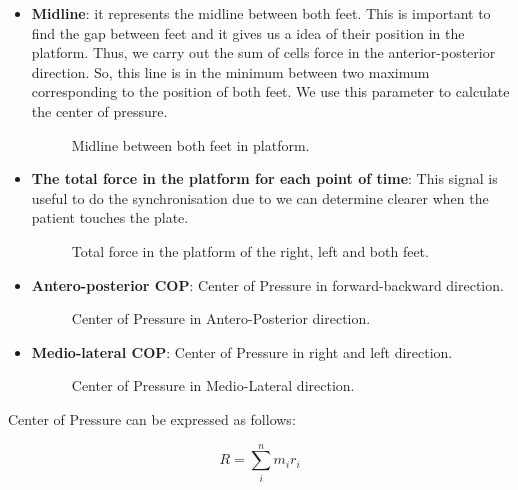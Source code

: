 \begin{itemize}
	\item \textbf{Midline}: it represents the midline between both feet. This is important to find the gap between feet and it gives us a idea of their position in the platform. Thus, we carry out the sum of cells force in the anterior-posterior direction. So, this line is in the minimum between two maximum corresponding to the position of both feet. We use this parameter to calculate the center of pressure.
	\begin{figure}[H]
		\centering
		\caption{Midline between both feet in platform.}
		\label{fig:midlineForceplate}
	\end{figure}
	
	\item \textbf{The total force in the platform for each point of time}: This signal is useful to do the synchronisation due to we can determine clearer when the patient touches the plate.
		\begin{figure}[H]
			\centering
			\caption{Total force in the platform of the right, left and both feet.}
			\label{fig:forceFP}
		\end{figure}
\newpage	
	\item \textbf{Antero-posterior COP}: Center of Pressure in forward-backward direction.
		\begin{figure}[H]
			\centering
			\caption{Center of Pressure in Antero-Posterior direction.}
			\label{fig:APCOP}
		\end{figure}	
	
	\item \textbf{Medio-lateral  COP}: Center of Pressure  in right and left direction.
			\begin{figure}[H]
				\centering
				\caption{Center of Pressure in Medio-Lateral direction.}
				\label{fig:MLCOP}
			\end{figure}
	
\end{itemize}
\newpage
Center of Pressure can be expressed as follows:

\begin{equation}
	\label{COP}
	R=\sum_{i}^{n}m_{i}r_{i}
\end{equation}


